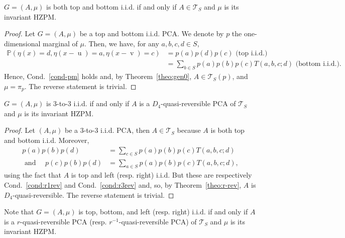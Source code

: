 \documentclass[10pt]{amsart}
\theoremstyle{definition}\newtheorem{defi}[theo]{Definition}\newtheorem{rema}[theo]{Remark}\newtheorem{exam}[theo]{Example}\newtheorem{exem}[theo]{Example}\newtheorem{nota}[theo]{Notation}
\newcounter{a}
\newcommand{\Cond}{Cond.}
\newcommand{\triang}[2]{\mathcal{T}_{#1} \left(#2 \right)}
\newcommand{\triangE}[1]{\mathcal{T}_{#1}}
\newcommand{\Pbb}{\mathbb{P}}
\DeclareMathOperator{\vu}{u}
\DeclareMathOperator{\vv}{v}
\begin{document}
\begin{prop}
$G=(A,\mu)$ is both top and bottom i.i.d. if and only if $A \in \triangE{S}$ and $\mu$ is its invariant HZPM.
\end{prop}

\begin{proof}
Let $G=(A,\mu)$ be a top and bottom i.i.d. PCA. We denote by $p$ the one-dimensional marginal of $\mu$. Then, we have, for any $a,b,c,d \in S$,
\begin{align*}
\Pbb\left(\eta(x)=d,\eta(x-\vu)=a,\eta(x-\vv)=c\right) & = p(a) p(d) p(c) \text{ (top i.i.d.)} \\
& =\!\sum_{b\in S} p(a) p(b) p(c) T(a,b,c;d)\!\!\text{ (bottom i.i.d.)}.
\end{align*}
Hence, \Cond~\ref{cond-pm} holds and, by Theorem~\ref{theo:gen0}, $A \in \triang{S}{p}$, and $\mu=\pi_p$. The reverse statement is trivial.
\end{proof}

\begin{prop}
$G=(A,\mu)$ is 3-to-3 i.i.d. if and only if $A$ is a $D_4$-quasi-reversible PCA of $\triangE{S}$ and $\mu$ is its invariant HZPM.
\end{prop}

\begin{proof}
Let $(A,\mu)$ be a 3-to-3 i.i.d. PCA, then $A \in \triangE{S}$ because $A$ is both top and bottom i.i.d. Moreover,
\begin{align*}
p(a)p(b)p(d) & = \sum_{c\in S} p(a)p(b)p(c) T(a,b,c;d) \\
\text{ and } \quad p(c)p(b)p(d) & = \sum_{a\in S} p(a)p(b)p(c) T(a,b,c;d),
\end{align*}
using the fact that $A$ is top and left (resp. right) i.i.d. But these are respectively \Cond~\ref{cond:r1rev} and \Cond~\ref{cond:r3rev} and, so, by Theorem~\ref{theo:r-rev}, $A$ is $D_4$-quasi-reversible. The reverse statement is trivial.
\end{proof}

Note that $G=(A,\mu)$ is top, bottom, and left (resp. right) i.i.d. if and only if $A$ is a $r$-quasi-reversible PCA (resp. $r^{-1}$-quasi-reversible PCA) of $\triangE{S}$ and $\mu$ is its invariant HZPM.
\end{document}
